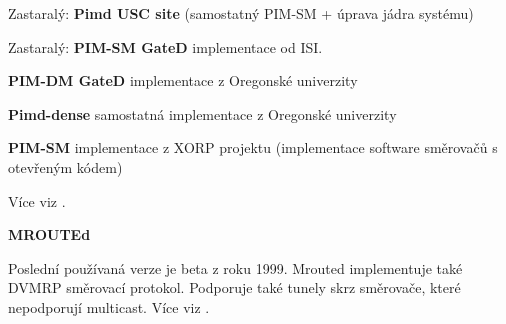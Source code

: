 Zastaralý: \textbf{Pimd USC site} (samostatný PIM-SM + úprava jádra systému)

Zastaralý: \textbf{PIM-SM GateD} implementace od ISI.

\textbf{PIM-DM GateD} implementace z Oregonské univerzity

\textbf{Pimd-dense} samostatná implementace z Oregonské univerzity

\textbf{PIM-SM} implementace z XORP projektu (implementace software směrovačů s otevřeným kódem)

\vspace{10pt}

Více viz \cite{pimdURL}.

\vspace{10pt}

\textbf{MROUTEd}

\vspace{5pt}

Poslední používaná verze je beta z roku 1999. Mrouted implementuje také DVMRP směrovací protokol. Podporuje také tunely skrz směrovače, které nepodporují multicast. Více viz \cite{mroutedURL}.
